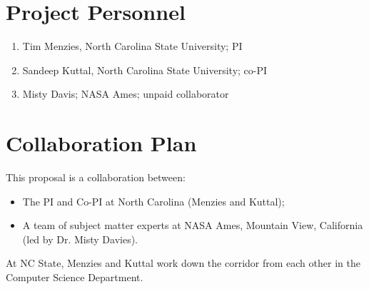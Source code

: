 \documentclass[twoside]{NSF}
\newenvironment{myitemize}
{ \begin{itemize}[topsep=0pt,itemsep=0pt,leftmargin=*]
    \setlength{\itemsep}{0pt}
    \setlength{\parskip}{0pt}
    \setlength{\parsep}{0pt}     }
{ \end{itemize}                  }
\newenvironment{mynumns}
{ \begin{enumerate}[topsep=0pt,itemsep=0pt,leftmargin=*]
    \setlength{\itemsep}{0pt}
    \setlength{\parskip}{0pt}
    \setlength{\parsep}{0pt}     }
{ \end{enumerate}   }
\newcommand{\be}{\begin{mynumns}}
\newcommand{\ee}{\end{mynumns}}
\newcommand{\bi}{\begin{myitemize}}
\newcommand{\ei}{\end{myitemize}}
\begin{document}
\begin{nsffacilities}
 
  
  

\end{nsffacilities}

  \pagestyle{empty}
\newpage

 \pagestyle{empty}
\section*{Project Personnel}
 
\be
\item Tim Menzies,
North Carolina State University; PI 
\item Sandeep Kuttal,  
North Carolina State University; co-PI 
\item 
Misty Davis; NASA Ames; unpaid collaborator
\ee

\newpage
 
\section*
{Collaboration Plan}

This proposal is a collaboration between:

\bi
\item The PI and Co-PI at North Carolina (Menzies and Kuttal);
\item A team of subject matter experts at NASA Ames, Mountain View, California (led by Dr. Misty Davies).
\ei

At NC State, Menzies and Kuttal work down the corridor from each other in the Computer Science Department.
\end{document}
